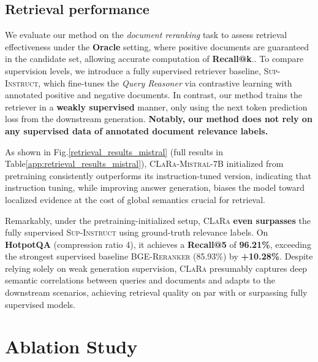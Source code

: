 \documentclass{applemlr}
\numberwithin{equation}{section}
\begin{document}
\subsection{Retrieval performance}
\label{sec_retrieval}

We evaluate our method on the \textit{document reranking} task to assess retrieval effectiveness under the \textbf{Oracle} setting, where positive documents are guaranteed in the candidate set, allowing accurate computation of \textbf{Recall@k}..
To compare supervision levels, we introduce a fully supervised retriever baseline, \textsc{Sup-Instruct}, which fine-tunes the \textit{Query Reasoner} via contrastive learning with annotated positive and negative documents.
In contrast, our method trains the retriever in a \textbf{weakly supervised} manner, only using the next token prediction loss from the downstream generation. \textbf{Notably, our method does not rely on any supervised data of annotated document relevance labels. }

As shown in Fig.\ref{retrieval_results_mistral} (full results in Table\ref{app:retrieval_results_mistral}),
\textsc{CLaRa-Mistral-7B} initialized from pretraining consistently outperforms its instruction-tuned version, indicating that instruction tuning, while improving answer generation, biases the model toward localized evidence at the cost of global semantics crucial for retrieval.


Remarkably, under the pretraining-initialized setup, \textsc{CLaRa} \textbf{even surpasses} the fully supervised \textsc{Sup-Instruct} using ground-truth relevance labels.
On \textbf{HotpotQA} (compression ratio 4), it achieves a \textbf{Recall@5} of \textbf{96.21\%}, exceeding the strongest supervised baseline \textsc{BGE-Reranker} (85.93\%) by \textbf{+10.28\%}.
Despite relying solely on weak generation supervision, \textsc{CLaRa} presumably captures deep semantic correlations between queries and documents and adapts to the downstream scenarios, achieving retrieval quality on par with or surpassing fully supervised models.













\section{Ablation Study}
\end{document}
